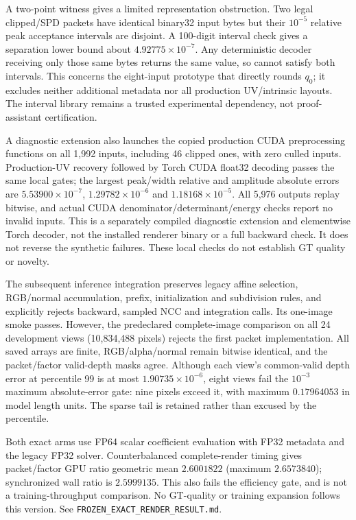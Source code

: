 \documentclass[11pt,a4paper]{article}
\begin{document}
A two-point witness gives a limited representation obstruction.
Two legal clipped/SPD packets have identical binary32 input bytes
but their $10^{-5}$ relative peak acceptance intervals are disjoint.
A 100-digit interval check gives a separation lower bound about
$4.92775\times10^{-7}$. Any deterministic decoder receiving only
those same bytes returns the same value, so cannot satisfy both
intervals. This concerns the eight-input prototype that directly
rounds $q_0$; it excludes neither additional metadata nor all
production UV/intrinsic layouts. The interval library remains a
trusted experimental dependency, not proof-assistant certification.

A diagnostic extension also launches the copied production CUDA
preprocessing functions on all 1,992 inputs, including 46 clipped
ones, with zero culled inputs. Production-UV recovery followed by
Torch CUDA float32 decoding passes the same local gates; the largest
peak/width relative and amplitude absolute errors are
$5.53900\times10^{-7}$, $1.29782\times10^{-6}$ and
$1.18168\times10^{-5}$. All 5,976 outputs replay bitwise, and
actual CUDA denominator/determinant/energy checks report no invalid
inputs. This is a separately compiled diagnostic extension and
elementwise Torch decoder, not the installed renderer binary or a
full backward check. It does not reverse the synthetic failures.
These local checks do not establish GT quality or novelty.

The subsequent inference integration preserves legacy affine selection,
RGB/normal accumulation, prefix, initialization and subdivision rules,
and explicitly rejects backward, sampled NCC and integration calls.
Its one-image smoke passes. However, the predeclared complete-image
comparison on all 24 development views (10,834,488 pixels) rejects
the first packet implementation. All saved arrays are finite,
RGB/alpha/normal remain bitwise identical, and the packet/factor
valid-depth masks agree. Although each view's common-valid depth
error at percentile 99 is at most $1.90735\times10^{-6}$, eight
views fail the $10^{-3}$ maximum absolute-error gate: nine pixels
exceed it, with maximum $0.17964053$ in model length units.
The sparse tail is retained rather than excused by the percentile.

Both exact arms use FP64 scalar coefficient evaluation with FP32
metadata and the legacy FP32 solver. Counterbalanced complete-render
timing gives packet/factor GPU ratio geometric mean $2.6001822$
(maximum $2.6573840$); synchronized wall ratio is $2.5999135$.
This also fails the efficiency gate, and is not a training-throughput
comparison. No GT-quality or training expansion follows this version.
See \texttt{FROZEN\_EXACT\_RENDER\_RESULT.md}.
\end{document}

